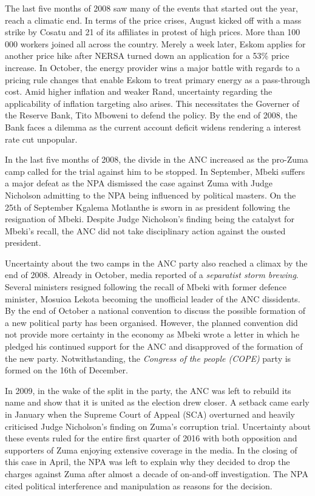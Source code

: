 \documentclass[11pt,preprint, authoryear]{elsarticle}
\numberwithin{equation}{section}
\numberwithin{figure}{section}
\numberwithin{table}{section}
\begin{document}
The last five months of 2008 saw many of the events that started out the
year, reach a climatic end. In terms of the price crises, August kicked
off with a mass strike by Cosatu and 21 of its affiliates in protest of
high prices. More than 100 000 workers joined all across the country.
Merely a week later, Eskom applies for another price hike after NERSA
turned down an application for a 53\% price increase. In October, the
energy provider wins a major battle with regards to a pricing rule
changes that enable Eskom to treat primary energy as a pass-through
cost. Amid higher inflation and weaker Rand, uncertainty regarding the
applicability of inflation targeting also arises. This necessitates the
Governer of the Reserve Bank, Tito Mboweni to defend the policy. By the
end of 2008, the Bank faces a dilemma as the current account deficit
widens rendering a interest rate cut unpopular.

In the last five months of 2008, the divide in the ANC increased as the
pro-Zuma camp called for the trial against him to be stopped. In
September, Mbeki suffers a major defeat as the NPA dismissed the case
against Zuma with Judge Nicholson admitting to the NPA being influenced
by political masters. On the 25th of September Kgalema Motlanthe is
sworn in as president following the resignation of Mbeki. Despite Judge
Nicholson's finding being the catalyst for Mbeki's recall, the ANC did
not take disciplinary action against the ousted president.

Uncertainty about the two camps in the ANC party also reached a climax
by the end of 2008. Already in October, media reported of a
\emph{separatist storm brewing}. Several ministers resigned following
the recall of Mbeki with former defence minister, Mosuioa Lekota
becoming the unofficial leader of the ANC dissidents. By the end of
October a national convention to discuss the possible formation of a new
political party has been organised. However, the planned convention did
not provide more certainty in the economy as Mbeki wrote a letter in
which he pledged his continued support for the ANC and disapproved of
the formation of the new party. Notwithstanding, the
\emph{Congress of the people (COPE)} party is formed on the 16th of
December.

In 2009, in the wake of the split in the party, the ANC was left to
rebuild its name and show that it is united as the election drew closer.
A setback came early in January when the Supreme Court of Appeal (SCA)
overturned and heavily criticised Judge Nicholson's finding on Zuma's
corruption trial. Uncertainty about these events ruled for the entire
first quarter of 2016 with both opposition and supporters of Zuma
enjoying extensive coverage in the media. In the closing of this case in
April, the NPA was left to explain why they decided to drop the charges
against Zuma after almost a decade of on-and-off investigation. The NPA
cited political interference and manipulation as reasons for the
decision.
\end{document}
